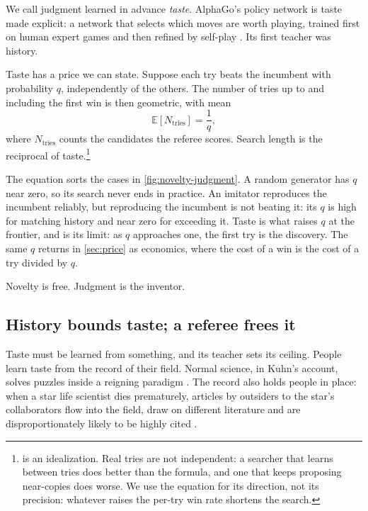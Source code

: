 We call judgment learned in advance \emph{taste}. AlphaGo's policy network is taste made explicit: a network that selects which moves are worth playing, trained first on human expert games and then refined by self-play \citep{silver2016mastering}. Its first teacher was history.

Taste has a price we can state. Suppose each try beats the incumbent with probability $q$, independently of the others. The number of tries up to and including the first win is then geometric, with mean
\begin{equation}
  \mathbb{E}[N_{\text{tries}}] = \frac{1}{q},
  \label{eq:taste}
\end{equation}
where $N_{\text{tries}}$ counts the candidates the referee scores. Search length is the reciprocal of taste.\footnote{ is an idealization. Real tries are not independent: a searcher that learns between tries does better than the formula, and one that keeps proposing near-copies does worse. We use the equation for its direction, not its precision: whatever raises the per-try win rate shortens the search.}

The equation sorts the cases in \cref{fig:novelty-judgment}. A random generator has $q$ near zero, so its search never ends in practice. An imitator reproduces the incumbent reliably, but reproducing the incumbent is not beating it: its $q$ is high for matching history and near zero for exceeding it. Taste is what raises $q$ at the frontier, and \searchone{} is its limit: as $q$ approaches one, the first try is the discovery. The same $q$ returns in \cref{sec:price} as economics, where the cost of a win is the cost of a try divided by $q$.

\begin{keyidea}
Novelty is free. Judgment is the inventor.
\end{keyidea}

\subsection{History bounds taste; a referee frees it}\label{sub:anatomy-history}

Taste must be learned from something, and its teacher sets its ceiling. People learn taste from the record of their field. Normal science, in Kuhn's account, solves puzzles inside a reigning paradigm \citep{kuhn1962structure}. The record also holds people in place: when a star life scientist dies prematurely, articles by outsiders to the star's collaborators flow into the field, draw on different literature and are disproportionately likely to be highly cited \citep{azoulay2019funeral}.

